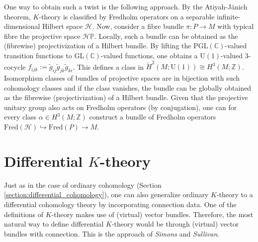 {    One way to obtain such a twist is the following approach. By the Atiyah-J\"anich theorem, $K$-theory is classified by Fredholm operators on a separable infinite-dimensional Hilbert space $\mathcal{H}$. Now, consider a fibre bundle $\pi:P\rightarrow M$ with typical fibre the projective space $\mathcal{H}\mathbb{P}$. Locally, such a bundle can be obtained as the (fibrewise) projectivization of a Hilbert bundle. By lifting the $\mathrm{PGL}(\mathbb{C})$-valued transition functions to $\mathrm{GL}(\mathbb{C})$-valued functions, one obtains a $\mathrm{U}(1)$-valued 3-cocycle $f_{ijk}:=\widetilde{g}_{ij}\widetilde{g}_{jk}\widetilde{g}_{ki}$. This defines a class in $\check{H}^2(M;\mathrm{U}(1))\cong H^3(M;\mathbb{Z})$. Isomorphism classes of bundles of projective spaces are in bijection with such cohomology classes and if the class vanishes, the bundle can be globally obtained as the fibrewise (projectivization) of a Hilbert bundle. Given that the projective unitary group also acts on Fredholm operators (by conjugation), one can for every class $\alpha\in H^3(M;\mathbb{Z})$ construct a bundle of Fredholm operators $\mathrm{Fred}(\mathcal{H})\hookrightarrow\mathrm{Fred}(P)\rightarrow M$.


\section{\texorpdfstring{Differential $K$-theory}{Differential K-theory}}

    Just as in the case of ordinary cohomology (Section \ref{section:differential_cohomology}), one can also generalize ordinary $K$-theory to a differential cohomology theory by incorporating connection data. One of the definitions of $K$-theory makes use of (virtual) vector bundles. Therefore, the most natural way to define differential $K$-theory would be through (virtual) vector bundles with connection. This is the approach of \textit{Simons} and \textit{Sullivan}.

    }
